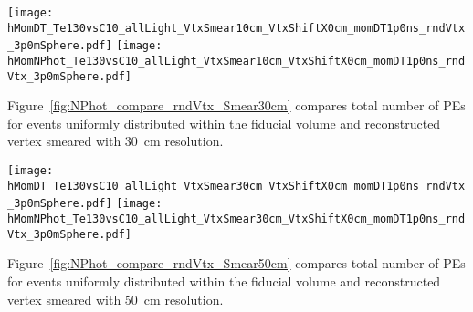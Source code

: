 \begin{figure*}[ht]
  \centering
  \texttt{[image: hMomDT\_Te130vsC10\_allLight\_VtxSmear10cm\_VtxShiftX0cm\_momDT1p0ns\_rndVtx\_3p0mSphere.pdf]}
  \texttt{[image: hMomNPhot\_Te130vsC10\_allLight\_VtxSmear10cm\_VtxShiftX0cm\_momDT1p0ns\_rndVtx\_3p0mSphere.pdf]}
  \caption{(Left) Difference between measured PE arrival time and arrival time prediction based on
        vertex location (T$^{predicted} = |r_{hit} - r_{vtx}|/v_{phot}$, where $v_phot = c/1.53$).
        $\vbb$-decay (black solid line) and $\Cten$ events (magenta dashed line) are compared.
        Vertical line at 1~ns indicates cut for early light selection.
        (Right) Total number of PEs in the early light sample.
        $^{10}$C events with energy deposition in the 10\% energy range around Q-value are
        selected. Verticies are uniformly distributed within the fiducial volume, $R<3$~m.
        {\bf Vetrex is smeared with 10~cm resolution.}}
\label{fig:NPhot_compare_rndVtx_Smear10cm}
\end{figure*}



Figure~\ref{fig:NPhot_compare_rndVtx_Smear30cm} compares total number of PEs for events uniformly
distributed within the fiducial volume and reconstructed vertex smeared with 30~cm resolution.

\begin{figure*}[ht]
  \centering
  \texttt{[image: hMomDT\_Te130vsC10\_allLight\_VtxSmear30cm\_VtxShiftX0cm\_momDT1p0ns\_rndVtx\_3p0mSphere.pdf]}
  \texttt{[image: hMomNPhot\_Te130vsC10\_allLight\_VtxSmear30cm\_VtxShiftX0cm\_momDT1p0ns\_rndVtx\_3p0mSphere.pdf]}
  \caption{(Left) Difference between measured PE arrival time and arrival time prediction based on
        vertex location (T$^{predicted} = |r_{hit} - r_{vtx}|/v_{phot}$, where $v_phot = c/1.53$).
        $\vbb$-decay (black solid line) and $\Cten$ events (magenta dashed line) are compared.
        Vertical line at 1~ns indicates cut for early light selection.
        (Right) Total number of PEs in the early light sample.
        $^{10}$C events with energy deposition in the 10\% energy range around Q-value. are
        selected. Verticies are uniformly distributed within the fiducial volume, $R<3$~m.
        {\bf Vetrex is smeared with 30~cm resolution.}}
\label{fig:NPhot_compare_rndVtx_Smear30cm}
\end{figure*}


Figure~\ref{fig:NPhot_compare_rndVtx_Smear50cm} compares total number of PEs for events uniformly
distributed within the fiducial volume and reconstructed vertex smeared with 50~cm resolution.

